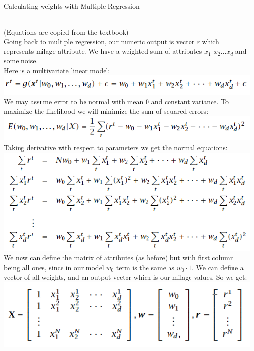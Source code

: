 \documentclass[12pt, letterpaper]{article}
\begin{document}
\begin{enumerate}[label=\Roman*.]
	{\bf \item Calculating weights with Multiple Regression} \\
	(Equations are copied from the textbook) \\
	
	Going back to multiple regression, our numeric output is vector {\it r} which represents milage attribute.  We have a weighted sum of attributes \( x_1, x_2 ... x_d\) and some noise.  \\
	
	Here is a multivariate linear model: \\
	\includegraphics[scale=0.5]{pics/model.png} \\
	We may assume error to be normal with mean 0 and constant variance. To maximize the likelihood we will minimize the sum of squared errors: \\
	\includegraphics[scale=0.5]{pics/errors.png} \\
	Taking derivative with respect to parameters we get the normal equations: \\
	\includegraphics[scale=0.5]{pics/normal.png} \\
	We now can define the matrix of attributes (as before) but with first column being all ones, since in our model \(w_0\) term is the same as \(w_0 \cdot 1 \). We can define a vector of all weights, and an output vector which is our milage values. So we get: \\
	\includegraphics[scale=0.5]{pics/attr.png} \\ 

\end{enumerate}
\end{document}
